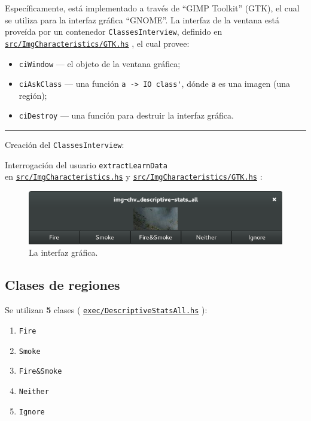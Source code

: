 \documentclass{article}
\newcommand{\crule}[2][1pt]
    {\begin{center}\rule{#2\textwidth}{#1}\end{center}}
\newcommand\refcode[2]{ \href{#1}{\texttt{#2}} }
\begin{document}
Específicamente, está implementado a través de ``GIMP Toolkit'' (GTK), el cual se utiliza para la interfaz gráfica ``GNOME''. La interfaz de la ventana está proveída por un contenedor \verb|ClassesInterview|, definido en \\ \refcode{\GTK}{src/ImgCharacteristics/GTK.hs}, el cual provee:
\begin{itemize}
    \item \verb|ciWindow| --- el objeto de la ventana gráfica;
    \item \verb|ciAskClass| --- una función \verb|a -> IO class'|, dónde \verb|a| es una 
                                imagen (una región);
    \item \verb|ciDestroy| --- una función para destruir la interfaz gráfica.
\end{itemize}

\crule{1}
\medskip
Creación del \verb|ClassesInterview|:
\medskip



\medskip
Interrogación del usuario \verb|extractLearnData| \\ en \refcode{ImgCharacteristics}{src/ImgCharacteristics.hs} y \refcode{\GTK}{src/ImgCharacteristics/GTK.hs}:
\medskip



\begin{figure}[h]
    \centering
    \includegraphics[width=\textwidth]{interview.png}
    \caption{La interfaz gráfica.}
\end{figure}

\subsection{Clases de regiones}
Se utilizan \textbf{5} clases (\refcode{\ExecAll}{exec/DescriptiveStatsAll.hs}):
\begin{enumerate}
    \item \verb|Fire|
    \item \verb|Smoke|
    \item \verb|Fire&Smoke|
    \item \verb|Neither|
    \item \verb|Ignore|
\end{enumerate}
\end{document}
